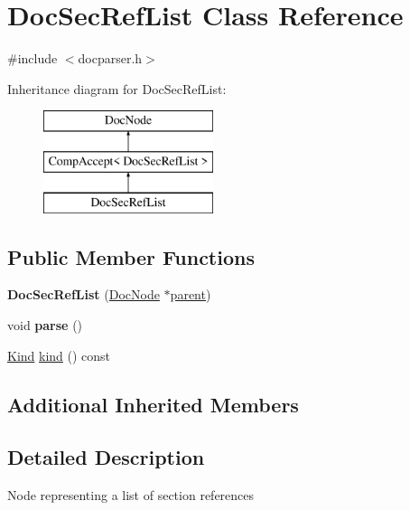 \hypertarget{class_doc_sec_ref_list}{}\section{Doc\+Sec\+Ref\+List Class Reference}
\label{class_doc_sec_ref_list}


{\ttfamily \#include $<$docparser.\+h$>$}

Inheritance diagram for Doc\+Sec\+Ref\+List\+:\begin{figure}[H]
\begin{center}
\leavevmode
\includegraphics[height=3.000000cm]{class_doc_sec_ref_list}
\end{center}
\end{figure}
\subsection*{Public Member Functions}
\begin{DoxyCompactItemize}
\item 
\mbox{\label{class_doc_sec_ref_list_af9cf9fe003005fd779fd263ab157f917}} 
{\bfseries Doc\+Sec\+Ref\+List} (\mbox{\hyperlink{class_doc_node}{Doc\+Node}} $\ast$\mbox{\hyperlink{class_doc_node_a73e8ad29a91cfceb0968eb00db71a23d}{parent}})
\item 
\mbox{\label{class_doc_sec_ref_list_a9b279250711bb61d12bff4c34e70d2f3}} 
void {\bfseries parse} ()
\item 
\mbox{\hyperlink{class_doc_node_aebd16e89ca590d84cbd40543ea5faadb}{Kind}} \mbox{\hyperlink{class_doc_sec_ref_list_a18c10aaace4f6fdaadb62fc08d58d06f}{kind}} () const
\end{DoxyCompactItemize}
\subsection*{Additional Inherited Members}


\subsection{Detailed Description}
Node representing a list of section references 

